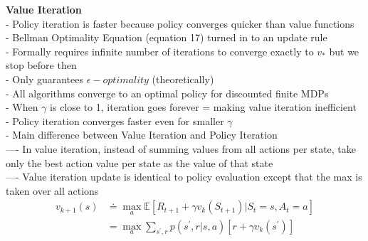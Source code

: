 \documentclass{article}
\begin{document}
\newpage
\noindent
\textbf{Value Iteration}\\
- Policy iteration is faster because policy converges quicker
than value functions\\
- Bellman Optimality Equation (equation 17) turned in to an update rule \\
- Formally requires infinite number of iterations to converge exactly to $v_{*}$
but we stop before then \\
- Only guarantees $\epsilon - optimality$ (theoretically)\\
- All algorithms converge to an optimal policy for discounted finite MDPs\\
- When $\gamma$ is close to 1, iteration goes forever = making value iteration
inefficient\\
- Policy iteration converges faster even for smaller $\gamma$\\
- Main difference between Value Iteration and Policy Iteration\\
---- In value iteration, instead of summing values from all actions per state,
take only the best action value per state as the value of that state\\
---- Value iteration update is identical to policy evaluation except that the max
is taken over all actions\\

\begin{equation}
\begin{aligned}
v_{k+1}(s) & \doteq \max _{a} \mathbb{E}\left[R_{t+1}+\gamma v_{k}\left(S_{t+1}\right) | S_{t}=s, A_{t}=a\right] \\
&=\max _{a} \sum_{s^{\prime}, r} p\left(s^{\prime}, r | s, a\right)\left[r+\gamma v_{k}\left(s^{\prime}\right)\right]
\end{aligned}
\end{equation}
\end{document}
